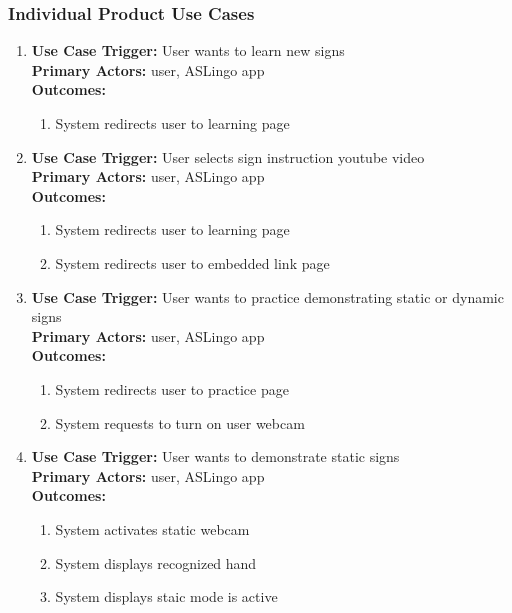 \documentclass[12pt, titlepage]{article}
\begin{document}
  \subsubsection{Individual Product Use Cases}

  \begin{enumerate}
      \item
      \textbf{Use Case Trigger:} User wants to learn new signs\\
      \textbf{Primary Actors:} user, ASLingo app\\
      \textbf{Outcomes:}
      \begin{enumerate}
          \item System redirects user to learning page 
      \end{enumerate} 

      \item
      \textbf{Use Case Trigger:} User selects sign instruction youtube video\\
      \textbf{Primary Actors:} user, ASLingo app\\
      \textbf{Outcomes:}
      \begin{enumerate}
          \item System redirects user to learning page
          \item System redirects user to embedded link page
      \end{enumerate} 

      \item
      \textbf{Use Case Trigger:} User wants to practice demonstrating static or dynamic signs\\
      \textbf{Primary Actors:} user, ASLingo app\\
      \textbf{Outcomes:}
      \begin{enumerate}
          \item System redirects user to practice page
          \item System requests to turn on user webcam
      \end{enumerate} 

      \item
      \textbf{Use Case Trigger:} User wants to demonstrate static signs\\
      \textbf{Primary Actors:} user, ASLingo app\\
      \textbf{Outcomes:}
      \begin{enumerate}
          \item System activates static webcam
          \item System displays recognized hand
          \item System displays staic mode is active    
      \end{enumerate} 


\end{enumerate}
\end{document}
